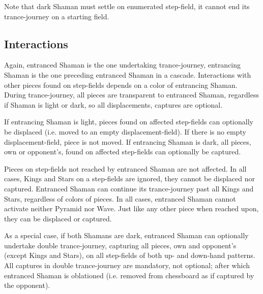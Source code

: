 \clearpage %

Note that dark Shaman must settle on enumerated step-field, it cannot end its
trance-journey on a starting field.


\subsection*{Interactions}
\label{sec:Conquest of Tlalocan/Trance-journey/Interactions}

Again, entranced Shaman is the one undertaking trance-journey, entrancing Shaman
is the one preceding entranced Shaman in a cascade. Interactions with other pieces
found on step-fields depends on a color of entrancing Shaman. During trance-journey,
all pieces are transparent to entranced Shaman, regardless if Shaman is light or
dark, so all displacements, captures are optional.

If entrancing Shaman is light, pieces found on affected step-fields can optionally
be displaced (i.e. moved to an empty displacement-field). If there is no empty
displacement-field, piece is not moved.\newline
\indent
If entrancing Shaman is dark, all pieces, own or opponent's, found on affected
step-fields can optionally be captured.

Pieces on step-fields not reached by entranced Shaman are not affected. In all
cases, Kings and Stars on a step-fields are ignored, they cannot be displaced
nor captured. Entranced Shaman can continue its trance-journey past all Kings
and Stars, regardless of colors of pieces.\newline
\indent
In all cases, entranced Shaman cannot activate neither Pyramid nor Wave. Just
like any other piece when reached upon, they can be displaced or captured.

As a special case, if both Shamans are dark, entranced Shaman can optionally
undertake double trance-journey, capturing all pieces, own and opponent's
(except Kings and Stars), on all step-fields of both up- and down-hand patterns.
All captures in double trance-journey are mandatory, not optional; after which
entranced Shaman is oblationed (i.e. removed from chessboard as if captured
by the opponent).

